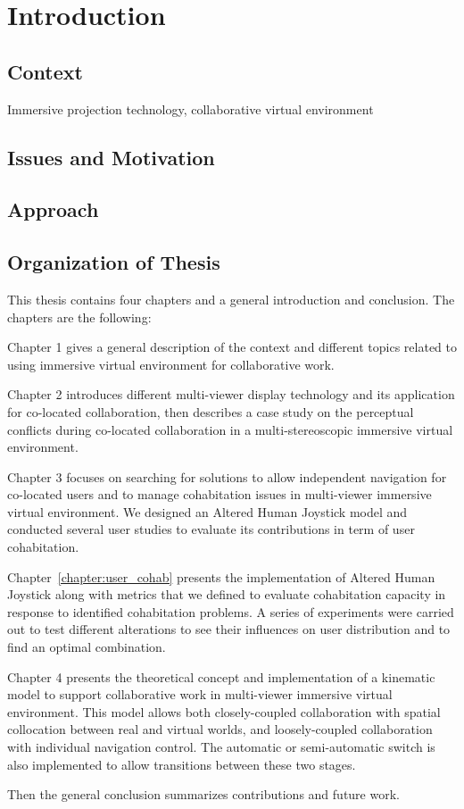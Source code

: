 \chapter*{Introduction}
\mtcaddchapter[Introduction]

\section*{Context}
Immersive projection technology, collaborative virtual environment

\section*{Issues and Motivation}

\section*{Approach}

\section*{Organization of Thesis}
This thesis contains four chapters and a general introduction and conclusion. The chapters are the following:

Chapter 1 gives a general description of the context and different topics related to using immersive virtual environment for collaborative work.

Chapter 2 introduces different multi-viewer display technology and its application for co-located collaboration, then describes a case study on the perceptual conflicts during co-located collaboration in a multi-stereoscopic immersive virtual environment.

Chapter 3 focuses on searching for solutions to allow independent navigation for co-located users and to manage cohabitation issues in multi-viewer immersive virtual environment. We designed an Altered Human Joystick model and conducted several user studies to evaluate its contributions in term of user cohabitation.

Chapter~\ref{chapter:user_cohab} presents the implementation of Altered Human Joystick along with metrics that we defined to evaluate cohabitation capacity in response to identified cohabitation problems. A series of experiments were carried out to test different alterations to see their influences on user distribution and to find an optimal combination.

Chapter 4 presents the theoretical concept and implementation of a kinematic model to support collaborative work in multi-viewer immersive virtual environment. This model allows both closely-coupled collaboration with spatial collocation between real and virtual worlds, and loosely-coupled collaboration with individual navigation control. The automatic or semi-automatic switch is also implemented to allow transitions between these two stages.

Then the general conclusion summarizes contributions and future work.